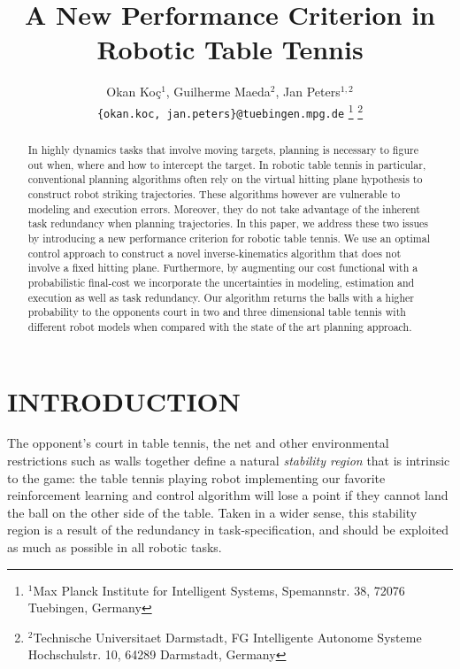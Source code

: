 \documentclass[letterpaper, 10 pt, conference]{ieeeconf}
\author{Okan Ko\c c$^{1}$, Guilherme Maeda$^{2}$, Jan Peters$^{1,2}$%
\\
{\tt\small \{okan.koc, jan.peters\}@tuebingen.mpg.de}%
\thanks{$^{1}$Max Planck Institute for Intelligent Systems,
        Spemannstr. 38, 72076 Tuebingen, Germany}
\thanks{$^{2}$Technische Universitaet Darmstadt, FG Intelligente Autonome Systeme
        Hochschulstr. 10, 64289 Darmstadt, Germany}
}
\title{A New Performance Criterion in Robotic Table Tennis}
\newcommand{\court}{\mathcal{T}} %
\begin{document}
\maketitle
\thispagestyle{empty}
\pagestyle{empty}

\begin{abstract}

In highly dynamics tasks that involve moving targets, planning is necessary to figure out when, where and how to intercept the target. In robotic table tennis in particular, conventional planning algorithms often rely on the virtual hitting plane hypothesis to construct robot striking trajectories. These algorithms however are vulnerable to modeling and execution errors. %
Moreover, they do not take advantage of the inherent task redundancy when planning trajectories. In this paper, we address these two issues by introducing a new performance criterion for robotic table tennis. We use an optimal control approach to construct a novel inverse-kinematics algorithm that does not involve a fixed hitting plane. Furthermore, by augmenting our cost functional with a probabilistic final-cost we incorporate the uncertainties in modeling, estimation and execution as well as task redundancy. Our algorithm returns the balls with a higher probability to the opponents court in two and three dimensional table tennis with different robot models when compared with the state of the art planning approach. 



\end{abstract}


%
%
%
%

\section{INTRODUCTION}

The opponent's court in table tennis, the net and other environmental restrictions such as walls together define a natural \emph{stability region} that is intrinsic to the game: the table tennis playing robot implementing our favorite reinforcement learning and control algorithm will lose a point if they cannot land the ball on the other side of the table. Taken in a wider sense, this stability region is a result of the redundancy in task-specification, and should be exploited as much as possible in all robotic tasks. 
\end{document}
